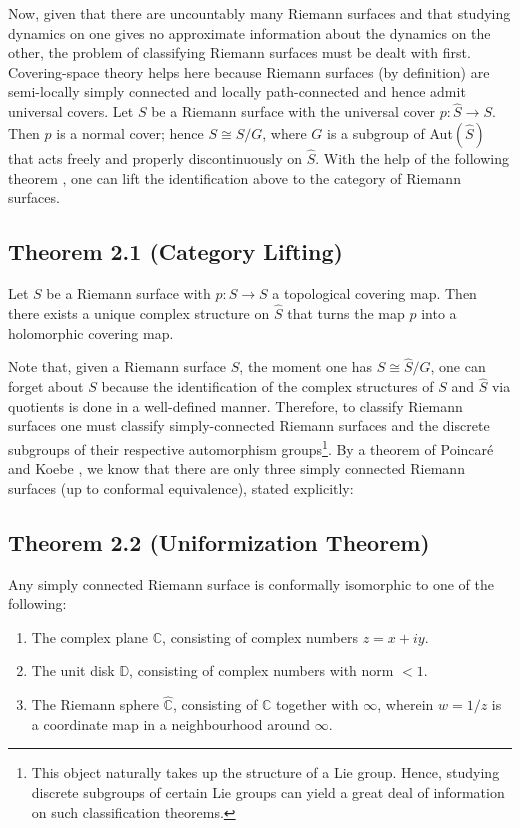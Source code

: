 \documentclass[11pt,a4paper]{article}
\begin{document}
        Now, given that there are uncountably many Riemann surfaces and that studying dynamics on one gives no approximate information about the dynamics on the other, the problem of classifying Riemann surfaces must be dealt with first. Covering-space theory helps here because Riemann surfaces (by definition) are semi-locally simply connected and locally path-connected and hence admit universal covers. Let $S$ be a Riemann surface with the universal cover $p : \hat{S} \rightarrow S$. Then $p$ is a normal cover; hence $S \cong \hat{S}/G$, where $G$ is a subgroup of Aut$(\hat{S})$ that acts freely and properly discontinuously on $\hat{S}$. With the help of the following theorem \cite{forster2012lectures}, one can lift the identification above to the category of Riemann surfaces.

        \subsection*{Theorem 2.1 (Category Lifting)} Let $S$ be a Riemann surface with $p: \hat{S} \rightarrow S$ a topological covering map. Then there exists a unique complex structure on $\hat{S}$ that turns the map $p$ into a holomorphic covering map.



        Note that, given a Riemann surface $S$, the moment one has $S \cong \hat{S}/G$, one can forget about $S$ because the identification of the complex structures of $S$ and $\hat{S}$ via quotients is done in a well-defined manner. Therefore, to classify Riemann surfaces one must classify simply-connected Riemann surfaces and the discrete subgroups of their respective automorphism groups\footnote{This object naturally takes up the structure of a Lie group. Hence, studying discrete subgroups of certain Lie groups can yield a great deal of information on such classification theorems.}. By a theorem of Poincar\'e and Koebe \cite{varolin2011riemann}, we know that there are only three simply connected Riemann surfaces (up to conformal equivalence), stated explicitly:

        \subsection*{Theorem 2.2 (Uniformization Theorem)} Any simply connected Riemann surface is conformally isomorphic to one of the following:
        \begin{enumerate}
            \item [(i)]The complex plane $\mathbb{C}$, consisting of complex numbers $z = x+iy$.
            \item [(ii)]The unit disk $\mathbb{D}$, consisting of complex numbers with norm $<1$.
            \item [(iii)]The Riemann sphere $\hat{\mathbb{C}}$, consisting of $\mathbb{C}$ together with $\infty$, wherein $w = 1/z$ is a coordinate map in a neighbourhood around $\infty$.
        \end{enumerate}
\end{document}
